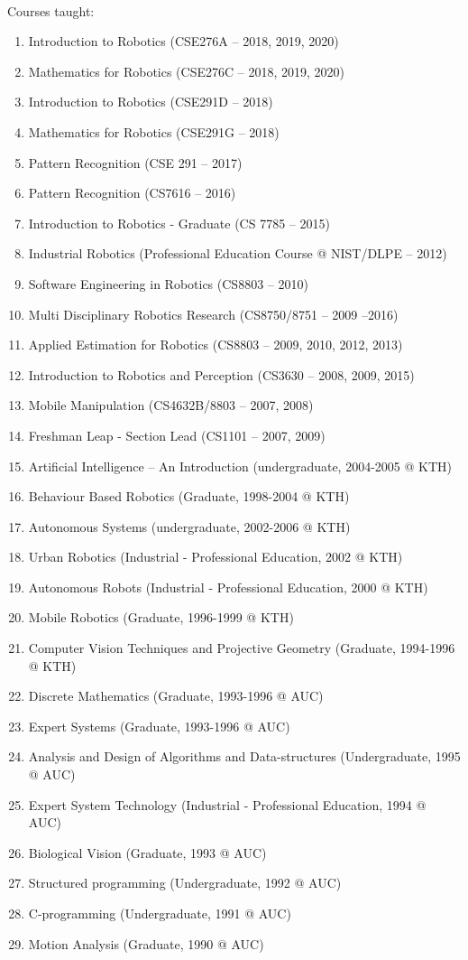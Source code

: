 \documentclass{article}
\begin{document}
\begin{cv}
\begin{cvlist}{~}
\item[Courses taught:]
  \begin{enumerate}
  \item Introduction to Robotics (CSE276A -- 2018, 2019, 2020)
  \item Mathematics for Robotics (CSE276C -- 2018, 2019, 2020)
  \item Introduction to Robotics (CSE291D -- 2018)
  \item Mathematics for Robotics (CSE291G -- 2018)
  \item Pattern Recognition (CSE 291 -- 2017)
  \item Pattern Recognition (CS7616 -- 2016)
  \item Introduction to Robotics - Graduate (CS 7785 -- 2015)
  \item Industrial Robotics (Professional Education Course @ NIST/DLPE
    -- 2012)
  \item Software Engineering in Robotics (CS8803 -- 2010)
  \item Multi Disciplinary Robotics Research (CS8750/8751 -- 2009 --2016)
  \item Applied Estimation for Robotics (CS8803 -- 2009, 2010, 2012, 2013)
  \item Introduction to Robotics and Perception (CS3630 -- 2008, 2009, 2015)
  \item Mobile Manipulation (CS4632B/8803 -- 2007, 2008)
  \item Freshman Leap - Section Lead (CS1101 -- 2007, 2009)
  \item Artificial Intelligence -- An Introduction (undergraduate,
    2004-2005 @ KTH)
  \item Behaviour Based Robotics (Graduate, 1998-2004 @ KTH)
  \item Autonomous Systems (undergraduate, 2002-2006 @ KTH)
  \item Urban Robotics (Industrial - Professional Education, 2002 @ KTH)
  \item Autonomous Robots (Industrial - Professional Education, 2000 @  KTH)
  \item Mobile Robotics (Graduate, 1996-1999 @ KTH)
  \item Computer Vision Techniques and Projective Geometry (Graduate,
    1994-1996 @ KTH)
  \item Discrete Mathematics (Graduate, 1993-1996 @ AUC)
  \item Expert Systems (Graduate, 1993-1996 @ AUC)
  \item Analysis and Design of Algorithms and Data-structures
    (Undergraduate, 1995 @ AUC)
  \item Expert System Technology (Industrial - Professional Education,
    1994 @ AUC)
  \item Biological Vision (Graduate, 1993 @ AUC)
  \item Structured programming (Undergraduate, 1992 @ AUC)
  \item C-programming (Undergraduate, 1991 @ AUC)
  \item Motion Analysis (Graduate, 1990 @ AUC)
 \end{enumerate}


\end{cvlist}
\end{cv}
\end{document}
